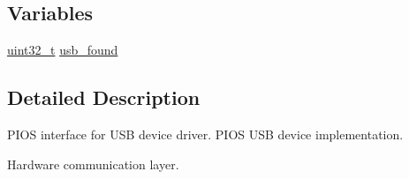 \subsection*{Variables}
\begin{DoxyCompactItemize}
\item 
\hyperlink{stdint_8h_a435d1572bf3f880d55459d9805097f62}{uint32\-\_\-t} \hyperlink{group___p_i_o_s___u_s_b_ga2a91e3a5ac99b2ec7e0025c14ea0a34d}{usb\-\_\-found}
\end{DoxyCompactItemize}


\subsection{Detailed Description}
P\-I\-O\-S interface for U\-S\-B device driver. P\-I\-O\-S U\-S\-B device implementation.

Hardware communication layer.

